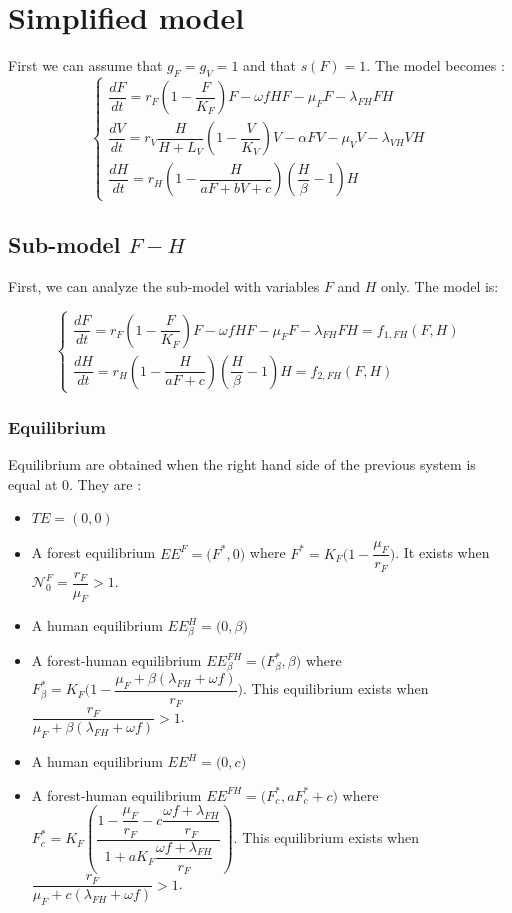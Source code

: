 \documentclass{article}
\newcommand{\lf}{\lambda_{FH}}
\newcommand{\lv}{\lambda_{VH}}
\newcommand{\NF}{\mathcal{N}_0^F}
\begin{document}
\section{Simplified model}
First we can assume that $g_F = g_V = 1$ and that $s(F) = 1$. The model becomes :
\begin{equation}    
\left\{ \begin{array}{l}
\dfrac{dF}{dt}=r_{F}\left(1-\dfrac{F}{K_{F}}\right)F-\omega f H F - \mu_F F -\lf F H \\
\dfrac{dV}{dt}=r_V \dfrac{H}{H + L_V} \left(1-\dfrac{V}{K_{V}}\right)V -\alpha FV-\mu_V V -\lv V H\\
\dfrac{dH}{dt}=r_H \left(1-\dfrac{H}{aF + bV + c} \right)  (\dfrac{H}{\beta} - 1) H
\end{array}\right.
\label{model:simplified}
\end{equation}

\subsection{Sub-model $F-H$}
First, we can analyze the sub-model with variables $F$ and $H$ only. The model is:

\begin{equation}    
\left\{ \begin{array}{l}
\dfrac{dF}{dt}=r_{F}\left(1-\dfrac{F}{K_{F}}\right)F-\omega f H F - \mu_F F -\lf F H = f_{1, FH} (F,H) \\
\dfrac{dH}{dt}=r_H \left(1-\dfrac{H}{aF + c} \right)  (\dfrac{H}{\beta} - 1) H = f_{2,FH}(F,H)
\end{array}\right.
\label{model:submodelFH}
\end{equation}

\subsubsection{Equilibrium}
Equilibrium are obtained when the right hand side of the previous system is equal at 0. They are :
\begin{itemize}
\item $TE = (0,0)$
\item A forest equilibrium $EE^F = \Big(F^*, 0 \Big) $ where $F^* = K_F \Big(1 - \dfrac{\mu_F}{r_F}\Big)$. It exists when $\NF = \dfrac{r_F}{\mu_F} > 1$.
\item A human equilibrium $EE^H_\beta = \Big(0,\beta \Big)$
\item A forest-human equilibrium $EE^{FH}_\beta = \Big(F^*_\beta, \beta\Big)$ where $F^*_\beta = K_F \Big(1-\dfrac{\mu_F + \beta(\lf + \omega f)}{r_F} \Big)$.
This equilibrium exists when $\dfrac{r_F}{\mu_F + \beta(\lf + \omega f)} > 1$.
\item A human equilibrium $EE^H = \Big(0,c \Big)$
\item A forest-human equilibrium $EE^{FH} = \Big(F^*_{c}, aF^*_{c} + c \Big)$ where $F^*_{c} = K_F \left( \dfrac{1 - \dfrac{\mu_F}{r_F} - c \dfrac{\omega f + \lf}{r_F}}{1 + a K_F \dfrac{\omega f + \lf}{r_F}} \right)$. This equilibrium exists when $\dfrac{r_F}{\mu_F + c(\lf + \omega f)} > 1$.
\end{itemize}
\end{document}
